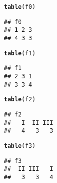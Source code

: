 \documentclass[paper=screen,mathserif]{beamer}\usepackage[]{graphicx}\usepackage[]{color}
\makeatletter
\newcommand{\hlstd}[1]{\textcolor[rgb]{0.345,0.345,0.345}{#1}}%
\newcommand{\hlkwd}[1]{\textcolor[rgb]{0.737,0.353,0.396}{\textbf{#1}}}%
\newenvironment{kframe}{%
 \def\at@end@of@kframe{}%
 \ifinner\ifhmode%
  \def\at@end@of@kframe{\end{minipage}}%
  \begin{minipage}{\columnwidth}%
 \fi\fi%
 \def\FrameCommand##1{\hskip\@totalleftmargin \hskip-\fboxsep
 \colorbox{shadecolor}{##1}\hskip-\fboxsep
     \hskip-\linewidth \hskip-\@totalleftmargin \hskip\columnwidth}%
 \MakeFramed {\advance\hsize-\width
   \@totalleftmargin\z@ \linewidth\hsize
   \@setminipage}}%
 {\par\unskip\endMakeFramed%
 \at@end@of@kframe}
\newenvironment{knitrout}{}{} %
\makeatother
\begin{document}
\begin{frame}[fragile]
\begin{knitrout}\scriptsize
{}\color{fgcolor}\begin{kframe}
\begin{alltt}
\hlkwd{table}\hlstd{(f0)}
\end{alltt}
\begin{verbatim}
## f0
## 1 2 3 
## 4 3 3
\end{verbatim}
\end{kframe}
\end{knitrout}
\begin{knitrout}\scriptsize
{}\color{fgcolor}\begin{kframe}
\begin{alltt}
\hlkwd{table}\hlstd{(f1)}
\end{alltt}
\begin{verbatim}
## f1
## 2 3 1 
## 3 3 4
\end{verbatim}
\end{kframe}
\end{knitrout}
\begin{knitrout}\scriptsize
{}\color{fgcolor}\begin{kframe}
\begin{alltt}
\hlkwd{table}\hlstd{(f2)}
\end{alltt}
\begin{verbatim}
## f2
##   I  II III 
##   4   3   3
\end{verbatim}
\end{kframe}
\end{knitrout}
\begin{knitrout}\scriptsize
{}\color{fgcolor}\begin{kframe}
\begin{alltt}
\hlkwd{table}\hlstd{(f3)}
\end{alltt}
\begin{verbatim}
## f3
##  II III   I 
##   3   3   4
\end{verbatim}
\end{kframe}
\end{knitrout}

\end{frame}
\end{document}
